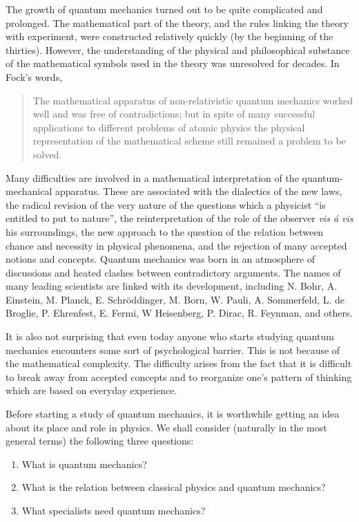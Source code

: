 \documentclass[a4paper,sfsidenotes,colorlinks=true]{tufte-book}
\numberwithin{equation}{section}
\numberwithin{figure}{section}
\begin{document}
The growth of quantum mechanics turned out to be quite complicated and prolonged. The mathematical part of the theory, and the rules linking the theory with experiment, were constructed relatively quickly (by the beginning of the thirties). However, the understanding of the physical and philosophical substance of the mathematical symbols used in the theory was unresolved for decades. In Fock's words, 
\begin{quote}%
The mathematical apparatus of non-relativistic quantum mechanics worked well and was free of contradictions; but in spite of many successful applications to different problems of atomic physics the physical representation of the mathematical scheme still remained a problem to be solved. \cite{fock-1957}
\end{quote}

Many difficulties are involved in a mathematical interpretation of the quantum-mechanical apparatus. These are associated with the dialectics of the new laws, the radical revision of the very nature of the questions which a physicist ``is entitled to put to nature'', the reinterpretation of the role of the observer \emph{vis \'a vis} his surroundings, the new approach to the question of the relation between chance and necessity in physical phenomena, and the rejection of many accepted notions and concepts. Quantum mechanics was born in an atmosphere of discussions and heated clashes between contradictory arguments. The names of many leading scientists are linked with its development, including N. Bohr, A. Einstein, M. Planck, E. Schr\"oddinger, M. Born, W. Pauli, A. Sommerfeld, L. de Broglie, P. Ehrenfest, E. Fermi, W Heisenberg, P. Dirac, R. Feynman, and others.

It is also not surprising that even today anyone who starts studying quantum mechanics encounters some sort of psychological barrier. This is not because of the mathematical complexity. The difficulty arises from the fact that it is difficult to break away from accepted concepts and to reorganize one's pattern of thinking which are based on everyday experience.

Before starting a study of quantum mechanics, it is worthwhile getting an idea about its place and role in physics. We shall consider (naturally in the most general terms) the following three questions: 
\begin{enumerate}
\item[]What is quantum mechanics? 
\item[]What is the relation between classical physics and quantum mechanics? 
\item[]What specialists need quantum mechanics? 
\end{enumerate}
\end{document}

